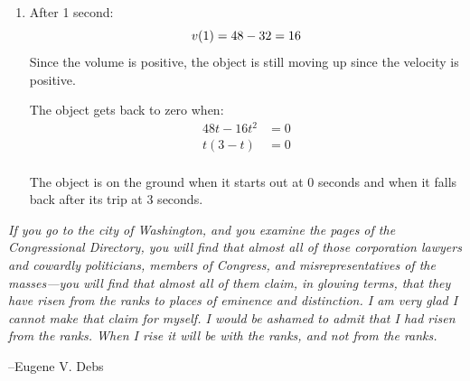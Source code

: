 \documentclass{exam}
\begin{document}
\begin{description}
\begin{enumerate}[a]
\item
After 1 second:
\[
  v(1) = 48 - 32 = 16 \\
\]
Since the volume is positive, the object is still moving up since the velocity is positive.

The object gets back to zero when:
\begin{align*}
  48t - 16t^2 &= 0 \\
  t(3-t) &= 0 \\
\end{align*}

The object is on the ground when it starts out at 0 seconds and when it falls back after its trip at 3 seconds.

\end{enumerate}

\end{description}


\else

\vspace{8 cm}

{\em If you go to the city of Washington, and you examine the pages of the Congressional Directory, you will find that
  almost all of those corporation lawyers and cowardly politicians, members of Congress, and misrepresentatives of the
  masses---you will find that almost all of them claim, in glowing terms, that they have risen from the ranks to places
  of eminence and distinction. I am very glad I cannot make that claim for myself. I would be ashamed to admit that I
  had risen from the ranks. When I rise it will be with the ranks, and not from the ranks.}

\vspace{.2 cm}

\hspace{1 cm} --Eugene V. Debs


\fi
\end{document}
